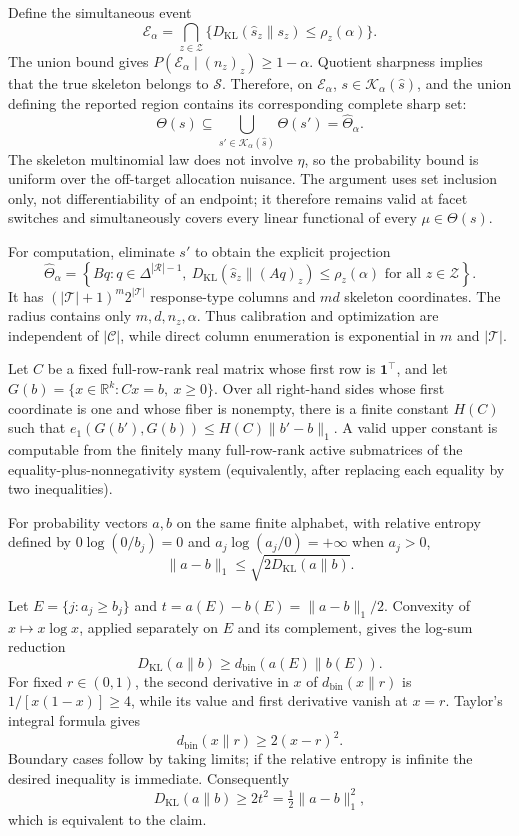 Define the simultaneous event
\[
\mathcal E_\alpha=
\bigcap_{z\in\mathcal Z}
\{D_{\mathrm{KL}}(\widehat s_z\|s_z)\le\rho_z(\alpha)\}.
\]
The union bound gives \(P(\mathcal E_\alpha\mid(n_z)_z)\ge1-\alpha\).  Quotient sharpness implies that the true skeleton belongs to \(\mathcal S\).  Therefore, on \(\mathcal E_\alpha\), \(s\in\mathcal K_\alpha(\widehat s)\), and the union defining the reported region contains its corresponding complete sharp set:
\[
\Theta(s)\subseteq
\bigcup_{s'\in\mathcal K_\alpha(\widehat s)}\Theta(s')
=\widehat\Theta_\alpha.
\]
The skeleton multinomial law does not involve \(\eta\), so the probability bound is uniform over the off-target allocation nuisance.  The argument uses set inclusion only, not differentiability of an endpoint; it therefore remains valid at facet switches and simultaneously covers every linear functional of every \(\mu\in\Theta(s)\).

For computation, eliminate \(s'\) to obtain the explicit projection
\[
\widehat\Theta_\alpha
=\left\{Bq:q\in\Delta^{|\mathcal R|-1},\ 
D_{\mathrm{KL}}(\widehat s_z\|(Aq)_z)\le\rho_z(\alpha)
\text{ for all }z\in\mathcal Z\right\}.
\]
It has \((|\mathcal T|+1)^m2^{|\mathcal T|}\) response-type columns and \(md\) skeleton coordinates.  The radius contains only \(m,d,n_z,\alpha\).  Thus calibration and optimization are independent of \(|\mathcal C|\), while direct column enumeration is exponential in \(m\) and \(|\mathcal T|\).

Let \(C\) be a fixed full-row-rank real matrix whose first row is \(\mathbf 1^\top\), and let \(G(b)=\{x\in\mathbb R^k:Cx=b,\ x\ge0\}\).  Over all right-hand sides whose first coordinate is one and whose fiber is nonempty, there is a finite constant \(H(C)\) such that \(e_1(G(b'),G(b))\le H(C)\|b'-b\|_1\).  A valid upper constant is computable from the finitely many full-row-rank active submatrices of the equality-plus-nonnegativity system (equivalently, after replacing each equality by two inequalities).

For probability vectors \(a,b\) on the same finite alphabet, with relative entropy defined by \(0\log(0/b_j)=0\) and \(a_j\log(a_j/0)=+\infty\) when \(a_j>0\),
\[
\|a-b\|_1\le\sqrt{2D_{\mathrm{KL}}(a\|b)}.
\]

Let \(E=\{j:a_j\ge b_j\}\) and \(t=a(E)-b(E)=\|a-b\|_1/2\).  Convexity of \(x\mapsto x\log x\), applied separately on \(E\) and its complement, gives the log-sum reduction
\[
D_{\mathrm{KL}}(a\|b)\ge d_{\mathrm{bin}}(a(E)\|b(E)).
\]
For fixed \(r\in(0,1)\), the second derivative in \(x\) of \(d_{\mathrm{bin}}(x\|r)\) is \(1/[x(1-x)]\ge4\), while its value and first derivative vanish at \(x=r\).  Taylor's integral formula gives
\[
d_{\mathrm{bin}}(x\|r)\ge2(x-r)^2.
\]
Boundary cases follow by taking limits; if the relative entropy is infinite the desired inequality is immediate.  Consequently
\[
D_{\mathrm{KL}}(a\|b)\ge2t^2=\tfrac12\|a-b\|_1^2,
\]
which is equivalent to the claim.

